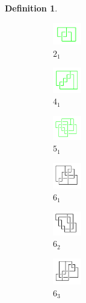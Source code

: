 \documentclass{article}
\theoremstyle{definition}
\newtheorem{defn}[thm]{Definition}
\theoremstyle{theorem}
\theoremstyle{proposition}
\theoremstyle{corollary}
\begin{document}
\begin{defn}
  \begin{figure}[H]
    \begin{subfigure}{0.075\textwidth}
    \includegraphics[width=1.25cm]{../Midterm_Poster/grid_diagram/handcuff_2_1.png}
    \caption{$2_{1}$} 
    \end{subfigure}
    \begin{subfigure}{0.075\textwidth}
    \includegraphics[width=1.25cm]{../Midterm_Poster/grid_diagram/handcuff_4_1.png}
    \caption{$4_{1}$} 
    \end{subfigure}
    \begin{subfigure}{0.075\textwidth}
    \includegraphics[width=1.25cm]{../Midterm_Poster/grid_diagram/handcuff_5_1.png}
    \caption{$5_{1}$} 
    \end{subfigure}
    \begin{subfigure}{0.075\textwidth}
    \includegraphics[width=1.25cm]{../Midterm_Poster/grid_diagram/handcuff_6_1.png}
    \caption{$6_{1}$} 
    \end{subfigure}
    \begin{subfigure}{0.075\textwidth}
    \includegraphics[width=1.25cm]{../Midterm_Poster/grid_diagram/handcuff_6_2.png}
    \caption{$6_{2}$} 
    \end{subfigure}
    \begin{subfigure}{0.075\textwidth}
    \includegraphics[width=1.25cm]{../Midterm_Poster/grid_diagram/handcuff_6_3.png}
    \caption{$6_{3}$} 
    \end{subfigure}
    \begin{subfigure}{0.075\textwidth}

\end{subfigure}
\end{figure}
\end{defn}
\end{document}
